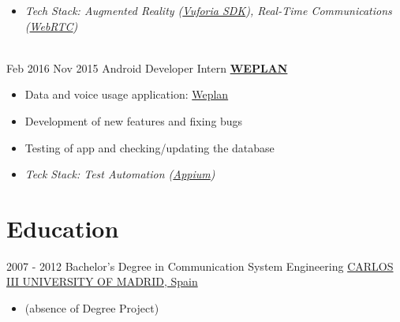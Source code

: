 \documentclass[letterpaper]{twentysecondcv} %
\begin{document}
\begin{twenty}
{{\begin{itemize}
		\item \textit{Tech Stack: {Augmented Reality (\href{https://www.vuforia.com/}{Vuforia SDK})}, Real-Time Communications (\href{https://webrtc.org/}{WebRTC})}
    \end{itemize}}
        }
     \\
     \twentyitem
   		{Feb 2016}
		{Nov 2015}
        {Android Developer Intern}
        {\href{http://weplan-app.com/}{\textbf{WEPLAN}}}
        {}
        {
        \begin{itemize}
        \item Data and voice usage application: \href{https://play.google.com/store/apps/details?id=com.cumberland.tutarifa&hl=en}{Weplan}
        \item Development of new features and fixing bugs
        \item Testing of app and checking/updating the database
        \item \textit{Teck Stack: Test Automation (\href{https://play.google.com/store/apps/details?id=com.cumberland.tutarifa&hl=en}{Appium})} 
    \end{itemize}
    	}
        
\end{twenty}


\section{Education}
\begin{twenty} %
	\twentyitem
        {2007 - 2012}
        {}
        {Bachelor's Degree in Communication System Engineering}
        \newline
        {\href{https://www.uc3m.es/Home}{CARLOS III UNIVERSITY OF MADRID, Spain}}
        {\begin{itemize}
            \item (absence of Degree Project)
        \end{itemize}}
        {}
        {}
\end{twenty}
\end{document}
